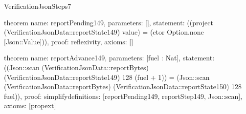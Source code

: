 \begin{lexlean}{VerificationJsonSteps7}
\begin{semanticmodule}
theorem{
  name: reportPending149,
  parameters: [],
  statement: ((project (VerificationJsonData::reportState149) value) = (ctor Option.none [Json::Value])),
  proof: reflexivity{},
  axioms: []
}

theorem{
  name: reportAdvance149,
  parameters: [fuel : Nat],
  statement: ((Json::scan (VerificationJsonData::reportBytes) (VerificationJsonData::reportState149) 128 (fuel + 1)) = (Json::scan (VerificationJsonData::reportBytes) (VerificationJsonData::reportState150) 128 fuel)),
  proof: simplify{definitions: [reportPending149, reportStep149, Json::scan]},
  axioms: [propext]
}

\end{semanticmodule}
\end{lexlean}
